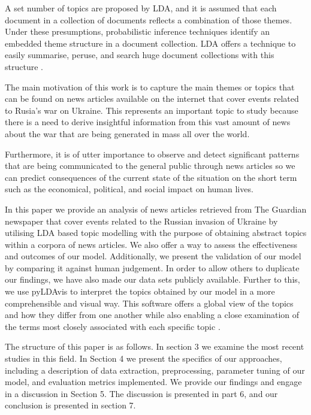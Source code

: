 \documentclass[twoside,12pt,a4paper]{article}
\begin{document}
A set number of topics are proposed by LDA, and it is assumed that each document in a collection of documents reflects a combination of those themes. Under these presumptions, probabilistic inference techniques identify an embedded theme structure in a document collection. LDA offers a technique to easily summarise, peruse, and search huge document collections with this structure \citep{blei_probabilistic_2010}.

The main motivation of this work is to capture the main themes or topics that can be found on news articles available on the internet that cover events related to Rusia’s war on Ukraine. This represents an important topic to study because there is a need to derive insightful information from this vast amount of news about the war that are being generated in mass all over the world.

Furthermore, it is of utter importance to observe and detect significant patterns that are being communicated to the general public through news articles so we can predict consequences of the current state of the situation on the short term such as the economical, political, and social impact on human lives.

In this paper we provide an analysis of news articles retrieved from The Guardian newspaper that cover events related to the Russian invasion of Ukraine by utilising LDA based topic modelling with the purpose of obtaining abstract topics within a corpora of news articles. We also offer a way to assess the effectiveness and outcomes of our model. Additionally, we present the validation of our model by comparing it against human judgement. In order to allow others to duplicate our findings, we have also made our data sets publicly available. Further to this, we use pyLDAvis to interpret the topics obtained by our model in a more comprehensible and visual way. This software offers a global view of the topics and how they differ from one another while also enabling a close examination of the terms most closely associated with each specific topic \citep{sievert_ldavis_2014}.

The structure of this paper is as follows. In section 3 we examine the most recent studies in this field. In Section 4 we present the specifics of our approaches, including a description of data extraction, preprocessing, parameter tuning of our model, and evaluation metrics implemented. We provide our findings and engage in a discussion in Section 5. The discussion is presented in part 6, and our conclusion is presented in section 7.
\end{document}
